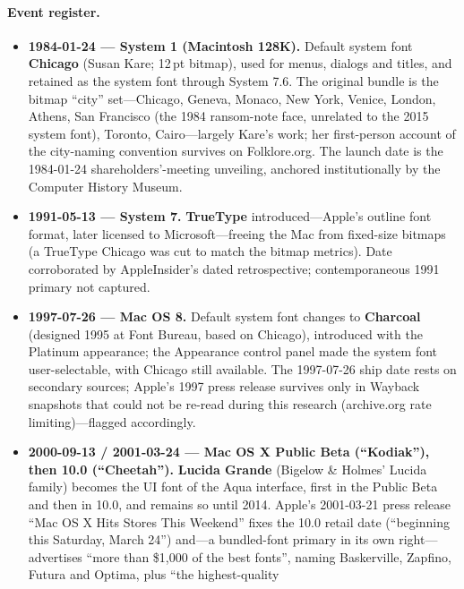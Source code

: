 \documentclass[10pt,a4paper]{article}
\begin{document}
\paragraph{Event register.}
\begin{itemize}[leftmargin=1.2em,itemsep=2pt]
\item \textbf{1984-01-24 --- System 1 (Macintosh 128K).} Default system font
\textbf{Chicago} (Susan Kare; 12\,pt bitmap), used for menus, dialogs and titles, and
retained as the system font through System 7.6. The original bundle is the bitmap
``city'' set---Chicago, Geneva, Monaco, New York, Venice, London, Athens, San
Francisco (the 1984 ransom-note face, unrelated to the 2015 system font), Toronto,
Cairo---largely Kare's work; her first-person account of the city-naming convention
survives on Folklore.org. The launch date is the 1984-01-24 shareholders'-meeting
unveiling, anchored institutionally by the Computer History
Museum.\cite{m-chicago,m-chicago-2,m-kare,m-kare-2,m-chm84,m-chm84-2}
\item \textbf{1991-05-13 --- System 7.} \textbf{TrueType} introduced---Apple's outline
font format, later licensed to Microsoft---freeing the Mac from fixed-size bitmaps (a
TrueType Chicago was cut to match the bitmap metrics). Date corroborated by
AppleInsider's dated retrospective; contemporaneous 1991 primary not
captured.\cite{m-truetype,m-sys7,m-sys7-2}
\item \textbf{1997-07-26 --- Mac OS 8.} Default system font changes to
\textbf{Charcoal} (designed 1995 at Font Bureau, based on Chicago), introduced with
the Platinum appearance; the Appearance control panel made the system font
user-selectable, with Chicago still available. The 1997-07-26 ship date rests on
secondary sources; Apple's 1997 press release survives only in Wayback snapshots that
could not be re-read during this research (archive.org rate limiting)---flagged
accordingly.\cite{m-charcoal,m-charcoal-2,m-os8,m-os8-2}
\item \textbf{2000-09-13 / 2001-03-24 --- Mac OS X Public Beta (``Kodiak''), then 10.0
(``Cheetah'').} \textbf{Lucida Grande} (Bigelow \& Holmes' Lucida family) becomes the
UI font of the Aqua interface, first in the Public Beta and then in 10.0, and remains
so until 2014. Apple's 2001-03-21 press release ``Mac OS X Hits Stores This Weekend''
fixes the 10.0 retail date (``beginning this Saturday, March 24'') and---a
bundled-font primary in its own right---advertises ``more than \$1{,}000 of the best
fonts'', naming Baskerville, Zapfino, Futura and Optima, plus ``the highest-quality

\end{itemize}
\end{document}
